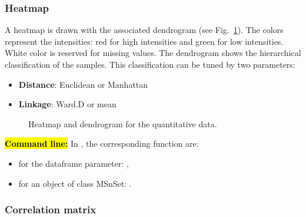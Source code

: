 \documentclass[12pt]{article}
\begin{document}
{\subsubsection {Heatmap}
A heatmap is drawn with the associated dendrogram (see Fig.~\ref{fig:sdhm}). 
The colors represent the intensities: red for high intensities and green for 
low intensities. White color is reserved for missing values.
The dendrogram shows the hierarchical classification of the samples. This 
classification can be tuned by two parameters:
\begin {itemize}
\item \textbf{Distance}: Euclidean or Manhattan
\item \textbf{Linkage}: Ward.D or mean
\end {itemize}

\begin {figure}
\centering
{}
\caption{Heatmap and dendrogram for the quantitative data.}\label{fig:sdhm}
\end {figure}

\hl{\bf Command line:} In , the corresponding function are:
\begin{itemize}
\item for the dataframe parameter: ,
\item for an object of class MSnSet: .
\end{itemize}

\subsubsection {Correlation matrix}

}
\end{document}
